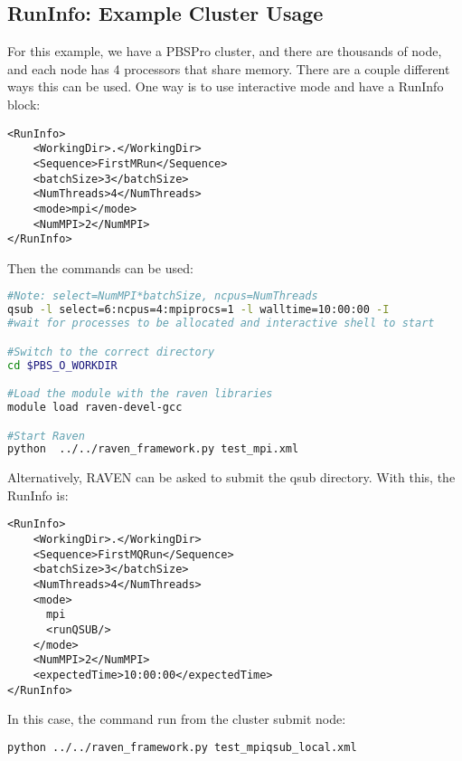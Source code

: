 \subsection{RunInfo: Example Cluster Usage}
\label{subsec:runinfoclusterexample}

For this example, we have a PBSPro cluster, and there are thousands of
node, and each node has 4 processors that share memory.  There are a
couple different ways this can be used.  One way is to use interactive
mode and have a RunInfo block:

\begin{lstlisting}[style=XML]
<RunInfo>
    <WorkingDir>.</WorkingDir>
    <Sequence>FirstMRun</Sequence>
    <batchSize>3</batchSize>
    <NumThreads>4</NumThreads>
    <mode>mpi</mode>
    <NumMPI>2</NumMPI>
</RunInfo>
\end{lstlisting}

Then the commands can be used:

\begin{lstlisting}[language=bash]
#Note: select=NumMPI*batchSize, ncpus=NumThreads
qsub -l select=6:ncpus=4:mpiprocs=1 -l walltime=10:00:00 -I
#wait for processes to be allocated and interactive shell to start

#Switch to the correct directory
cd $PBS_O_WORKDIR

#Load the module with the raven libraries
module load raven-devel-gcc

#Start Raven
python  ../../raven_framework.py test_mpi.xml
\end{lstlisting}

Alternatively, RAVEN can be asked to submit the qsub directory.  With
this, the RunInfo is:

\begin{lstlisting}[style=XML]
<RunInfo>
    <WorkingDir>.</WorkingDir>
    <Sequence>FirstMQRun</Sequence>
    <batchSize>3</batchSize>
    <NumThreads>4</NumThreads>
    <mode>
      mpi
      <runQSUB/>
    </mode>
    <NumMPI>2</NumMPI>
    <expectedTime>10:00:00</expectedTime>
</RunInfo>
\end{lstlisting}

In this case, the command run from the cluster submit node:

\begin{lstlisting}[language=bash]
python ../../raven_framework.py test_mpiqsub_local.xml
\end{lstlisting}

